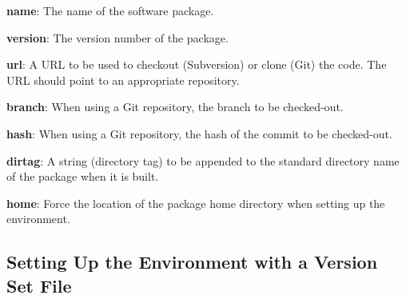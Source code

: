 \documentclass[12pt]{article}
\begin{document}
\begin{description}
\item{\bf name}: The name of the software package.
\item{\bf version}: The version number of the package.
\item{\bf url}: A URL to be used to checkout (Subversion) or clone
  (Git) the code. The URL should point to an appropriate repository.
\item{\bf branch}: When using a Git repository, the branch to be
  checked-out.
\item{\bf hash}: When using a Git repository, the hash of the commit to be checked-out.
\item{\bf dirtag}: A string (directory tag) to be appended to the
  standard directory name of the package when it is built.
\item{\bf home}: Force the location of the package home directory when setting up the environment.
\end{description}

\subsection{Setting Up the Environment with a Version Set File}
\end{document}

